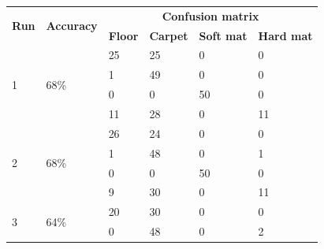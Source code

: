 \documentclass[USenglish]{ifimaster}  %
\begin{document}
\begin{table}[h]\ContinuedFloat
	\begin{subtable}[h]{1\textwidth} 
		\centering
		\captionsetup{justification=centering}
		\begin{tabular}{@{}llllll@{}}
			\toprule
			\multirow{2}{*}{\textbf{Run}} & \multirow{2}{*}{\textbf{Accuracy}} & \multicolumn{4}{c}{\textbf{Confusion matrix}} \\ \cmidrule(l){3-6} 
			&  & \multicolumn{1}{l|}{\textbf{Floor}} & \multicolumn{1}{l|}{\textbf{Carpet}} & \multicolumn{1}{l|}{\textbf{Soft mat}} & \textbf{Hard mat} \\ \midrule
			\multicolumn{1}{l|}{\multirow{4}{*}{1}} & \multicolumn{1}{l|}{\multirow{4}{*}{68\%}} & \multicolumn{1}{l|}{25} & \multicolumn{1}{l|}{25} & \multicolumn{1}{l|}{0} & 0 \\ \cmidrule(l){3-6} 
			\multicolumn{1}{l|}{} & \multicolumn{1}{l|}{} & \multicolumn{1}{l|}{1} & \multicolumn{1}{l|}{49} & \multicolumn{1}{l|}{0} & 0 \\ \cmidrule(l){3-6} 
			\multicolumn{1}{l|}{} & \multicolumn{1}{l|}{} & \multicolumn{1}{l|}{0} & \multicolumn{1}{l|}{0} & \multicolumn{1}{l|}{50} & 0 \\ \cmidrule(l){3-6} 
			\multicolumn{1}{l|}{} & \multicolumn{1}{l|}{} & \multicolumn{1}{l|}{11} & \multicolumn{1}{l|}{28} & \multicolumn{1}{l|}{0} & 11 \\ \midrule
			\multicolumn{1}{l|}{\multirow{4}{*}{2}} & \multicolumn{1}{l|}{\multirow{4}{*}{68\%}} & \multicolumn{1}{l|}{26} & \multicolumn{1}{l|}{24} & \multicolumn{1}{l|}{0} & 0 \\ \cmidrule(l){3-6} 
			\multicolumn{1}{l|}{} & \multicolumn{1}{l|}{} & \multicolumn{1}{l|}{1} & \multicolumn{1}{l|}{48} & \multicolumn{1}{l|}{0} & 1 \\ \cmidrule(l){3-6} 
			\multicolumn{1}{l|}{} & \multicolumn{1}{l|}{} & \multicolumn{1}{l|}{0} & \multicolumn{1}{l|}{0} & \multicolumn{1}{l|}{50} & 0 \\ \cmidrule(l){3-6} 
			\multicolumn{1}{l|}{} & \multicolumn{1}{l|}{} & \multicolumn{1}{l|}{9} & \multicolumn{1}{l|}{30} & \multicolumn{1}{l|}{0} & 11 \\ \midrule
			\multicolumn{1}{l|}{\multirow{4}{*}{3}} & \multicolumn{1}{l|}{\multirow{4}{*}{64\%}} & \multicolumn{1}{l|}{20} & \multicolumn{1}{l|}{30} & \multicolumn{1}{l|}{0} & 0 \\ \cmidrule(l){3-6} 
			\multicolumn{1}{l|}{} & \multicolumn{1}{l|}{} & \multicolumn{1}{l|}{0} & \multicolumn{1}{l|}{48} & \multicolumn{1}{l|}{0} & 2 \\ \cmidrule(l){3-6} 

\end{tabular}
\end{subtable}
\end{table}
\end{document}
